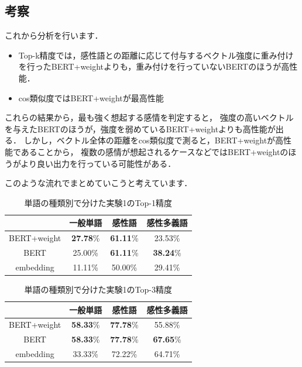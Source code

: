 	\subsection{考察}
		これから分析を行います．
		\begin{itemize}
			\item Top-k精度では，感性語との距離に応じて付与するベクトル強度に重み付けを行ったBERT+weightよりも，重み付けを行っていないBERTのほうが高性能．
			\item cos類似度ではBERT+weightが最高性能
		\end{itemize}
		これらの結果から，最も強く想起する感情を判定すると，
		強度の高いベクトルを与えたBERTのほうが，強度を弱めているBERT+weightよりも高性能が出る．
		しかし，ベクトル全体の距離をcos類似度で測ると，BERT+weightが高性能であることから，
		複数の感情が想起されるケースなどではBERT+weightのほうがより良い出力を行っている可能性がある．
		
		このような流れでまとめていこうと考えています．
		\begin{table}[H]
			\centering
			\caption{単語の種類別で分けた実験1のTop-1精度}
			\label{table:top-1_hinshi}
				\begin{tabular}{cccc}
					\hline
					& 一般単語 & 感性語 & 感性多義語 \\
					\hline \hline
					BERT+weight & \textbf{27.78}\% & \textbf{61.11}\% & 23.53\% \\
					BERT & 25.00\% & \textbf{61.11}\% & \textbf{38.24}\% \\
					embedding & 11.11\% & 50.00\% & 29.41\% \\
					\hline
				\end{tabular}
		\end{table}

		\begin{table}[H]
			\centering
			\caption{単語の種類別で分けた実験1のTop-3精度}
			\label{table:top3_hinshi}
				\begin{tabular}{cccc}
					\hline
					& 一般単語 & 感性語 & 感性多義語 \\
					\hline \hline
					BERT+weight & \textbf{58.33}\% & \textbf{77.78}\% & 55.88\% \\
					BERT & \textbf{58.33}\% & \textbf{77.78}\% & \textbf{67.65}\% \\
					embedding & 33.33\% & 72.22\% & 64.71\% \\
					\hline
				\end{tabular}
		\end{table}

